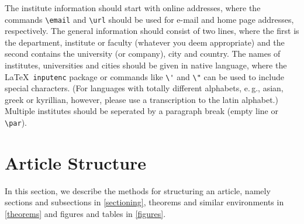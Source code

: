 \documentclass{eceasst}
\begin{document}
The institute information should start with online addresses, where the
commands \verb|\email| and \verb|\url| should be used for e-mail and home page
addresses, respectively.
The general information should consist of two lines, where the first is the
department, institute or faculty (whatever you deem appropriate) and the
second contains the university (or company), city and country.
The names of institutes, universities and cities should be given in native
language, where the \LaTeX\ \verb|inputenc| package or commands like
\verb|\'| and \verb|\"| can be used to include special characters.
(For languages with totally different alphabets, e.\,g., asian, greek or
kyrillian, however, please use a transcription to the latin alphabet.)
Multiple institutes should be seperated by a paragraph break (empty line or
\verb|\par|).




\section{Article Structure}\label{sect}
In this section, we describe the methods for structuring an article,
namely sections and subsections in \autoref{sectioning}, theorems and similar
environments in \autoref{theorems} and figures and tables in
\autoref{figures}.
\end{document}

